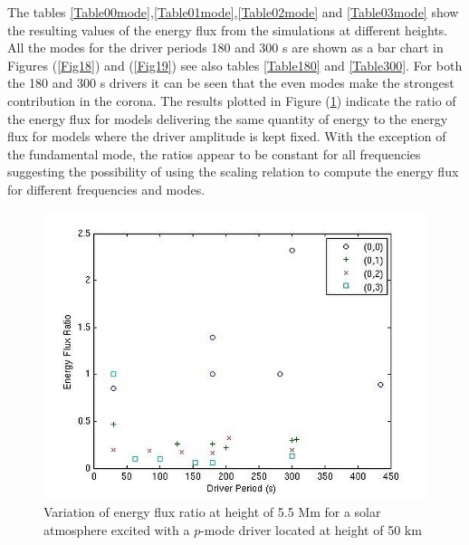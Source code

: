 \documentclass[preprint,authoryear,12pt]{elsarticle}
\begin{document}
The tables \ref{Table00mode},\ref{Table01mode},\ref{Table02mode} and \ref{Table03mode} show the resulting values of the energy flux from the simulations at different heights. All the modes for the driver periods 180 and 300 s are shown as a bar chart in Figures (\ref{Fig18}) and (\ref{Fig19}) see also tables \ref{Table180} and \ref{Table300}. For both the 180 and 300 s drivers it can be seen that the even modes make the strongest contribution in the corona. The results plotted in Figure (\ref{Fig20}) indicate the ratio of the energy flux for models delivering the same quantity of energy to the energy flux for models where the driver amplitude is kept fixed. With the exception of the fundamental mode, the ratios appear to be constant for all frequencies suggesting the possibility of using the scaling relation to compute the energy flux for different frequencies and modes.  
\begin{figure}[h]
\includegraphics[scale=0.6]{imrescale/ratio_varoverconst_eflux_vperiod_for_modes_5p5Mm.jpg}
\caption{Variation of energy flux ratio at height of 5.5 Mm for a solar atmosphere excited with a $p$-mode driver located 
at height of 50 km}
\label{Fig20}
\end{figure}
\end{document}
